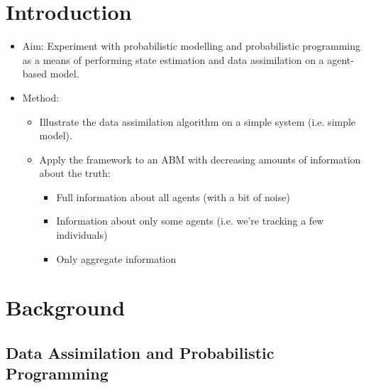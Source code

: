 \documentclass[runningheads]{llncs}
\begin{document}
\section{Introduction}

\begin{itemize}
\item Aim: Experiment with probabilistic modelling and probabilistic programming as a means of performing state estimation and data assimilation on a agent-based model.
\item Method:
	\begin{itemize}
	\item Illustrate the data assimilation algorithm on a simple system (i.e. simple model).
	\item Apply the framework to an ABM with decreasing amounts of information about the truth:
		\begin{itemize}
		\item Full information about all agents (with a bit of noise)
		\item Information about only some agents (i.e. we're tracking a few individuals)
		\item Only aggregate information
		\end{itemize}
	\end{itemize}
\end{itemize}

%
%
%
%
\section{Background}

\subsection{Data Assimilation and Probabilistic Programming}

$ $ %


\end{document}

